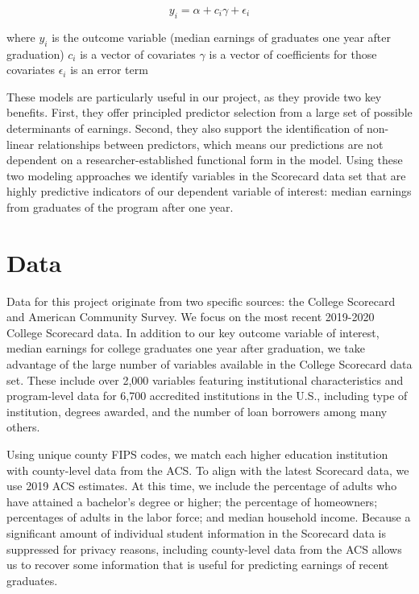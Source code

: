 \documentclass[a4paper, 12pt]{article}
\begin{document}
\[y_i = \alpha + c_i\gamma + \epsilon_i\]

\pagebreak

\noindent where
\newline
$y_i$ is the outcome variable (median earnings of graduates one year after graduation)
\newline
$c_i$ is a vector of covariates
\newline
$\gamma$ is a vector of coefficients for those covariates
\newline
$\epsilon_i$ is an error term

These models are particularly useful in our project, as they provide two key benefits. First, they offer principled predictor selection from a large set of possible determinants of earnings. Second, they also support the identification of non-linear relationships between predictors, which means our predictions are not dependent on a researcher-established functional form in the model. Using these two modeling approaches we identify variables in the Scorecard data set that are highly predictive indicators of our dependent variable of interest: median earnings from graduates of the program after one year.


\section*{Data}

Data for this project originate from two specific sources: the College Scorecard and American Community Survey. We focus on the most recent 2019-2020 College Scorecard data. In addition to our key outcome variable of interest, median earnings for college graduates one year after graduation, we take advantage of the large number of variables available in the College Scorecard data set. These include over 2,000 variables featuring institutional characteristics and program-level data for 6,700 accredited institutions in the U.S., including type of institution, degrees awarded, and the number of loan borrowers among many others.

Using unique county FIPS codes, we match each higher education institution with county-level data from the ACS. To align with the latest Scorecard data, we use 2019 ACS estimates. At this time, we include the percentage of adults who have attained a bachelor's degree or higher; the percentage of homeowners; percentages of adults in the labor force; and median household income. Because a significant amount of individual student information in the Scorecard data is suppressed for privacy reasons, including county-level data from the ACS allows us to recover some information that is useful for predicting earnings of recent graduates.
\end{document}
